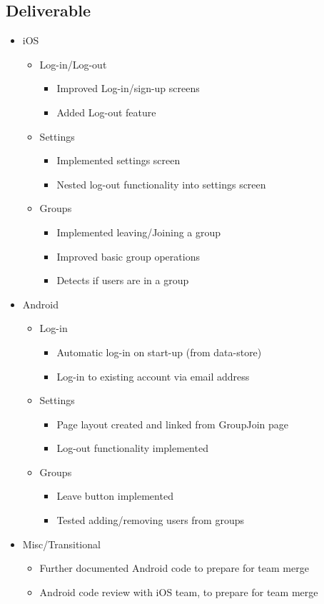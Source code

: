 \subsection{Deliverable}
\begin{itemize}
	\item iOS
	\begin{itemize}
		\item Log-in/Log-out
		\begin{itemize}
			\item Improved Log-in/sign-up screens
			\item Added Log-out feature
		\end{itemize}
		\item Settings
		\begin{itemize}
			\item Implemented settings screen
			\item Nested log-out functionality into settings screen
		\end{itemize}
		\item Groups
		\begin{itemize}
			\item Implemented leaving/Joining a group
			\item Improved basic group operations
			\item Detects if users are in a group
		\end{itemize}
	\end{itemize}
	\item Android
	\begin{itemize}
		\item Log-in
		\begin{itemize}
			\item Automatic log-in on start-up (from data-store)
			\item Log-in to existing account via email address
		\end{itemize}
		\item Settings
		\begin{itemize}
			\item Page layout created and linked from GroupJoin page
			\item Log-out functionality implemented
		\end{itemize}
		\item Groups
		\begin{itemize}
			\item Leave button implemented
			\item Tested adding/removing users from groups
		\end{itemize}
	\end{itemize}
	\item Misc/Transitional
	\begin{itemize}
		\item Further documented Android code to prepare for team merge
		\item Android code review with iOS team, to prepare for team merge
	\end{itemize}
\end{itemize}
